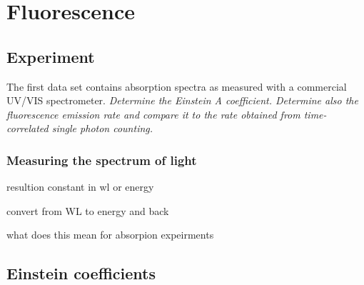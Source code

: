 

\chapter{Fluorescence}



\section{Experiment}

The first data set contains absorption spectra as measured with a commercial UV/VIS spectrometer. 
\textit{Determine the Einstein A coefficient. Determine also the fluorescence emission rate and compare it to the rate obtained from time-correlated single photon counting.}


\subsection{Measuring the spectrum of light}

resultion constant in wl or energy

convert from WL to energy and back

what does this mean for absorpion expeirments


\section{Einstein coefficients}

